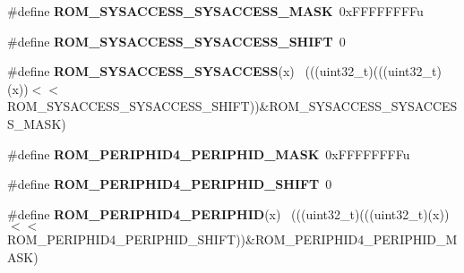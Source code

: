 \begin{DoxyCompactItemize}
\item 
\hypertarget{group___r_o_m___register___masks_gab3acbf5e9fc0f3ad82ae4e0004d0216d}{}\#define {\bfseries R\+O\+M\+\_\+\+S\+Y\+S\+A\+C\+C\+E\+S\+S\+\_\+\+S\+Y\+S\+A\+C\+C\+E\+S\+S\+\_\+\+M\+A\+S\+K}~0x\+F\+F\+F\+F\+F\+F\+F\+Fu\label{group___r_o_m___register___masks_gab3acbf5e9fc0f3ad82ae4e0004d0216d}

\item 
\hypertarget{group___r_o_m___register___masks_ga3490b2f91c6a67625992dbc90f0e5a27}{}\#define {\bfseries R\+O\+M\+\_\+\+S\+Y\+S\+A\+C\+C\+E\+S\+S\+\_\+\+S\+Y\+S\+A\+C\+C\+E\+S\+S\+\_\+\+S\+H\+I\+F\+T}~0\label{group___r_o_m___register___masks_ga3490b2f91c6a67625992dbc90f0e5a27}

\item 
\hypertarget{group___r_o_m___register___masks_ga81c24d70e0f959fbd6e8d3cb9aa311cc}{}\#define {\bfseries R\+O\+M\+\_\+\+S\+Y\+S\+A\+C\+C\+E\+S\+S\+\_\+\+S\+Y\+S\+A\+C\+C\+E\+S\+S}(x)                          ~(((uint32\+\_\+t)(((uint32\+\_\+t)(x))$<$$<$R\+O\+M\+\_\+\+S\+Y\+S\+A\+C\+C\+E\+S\+S\+\_\+\+S\+Y\+S\+A\+C\+C\+E\+S\+S\+\_\+\+S\+H\+I\+F\+T))\&R\+O\+M\+\_\+\+S\+Y\+S\+A\+C\+C\+E\+S\+S\+\_\+\+S\+Y\+S\+A\+C\+C\+E\+S\+S\+\_\+\+M\+A\+S\+K)\label{group___r_o_m___register___masks_ga81c24d70e0f959fbd6e8d3cb9aa311cc}

\item 
\hypertarget{group___r_o_m___register___masks_gad17e07925ea552218422be227581a58f}{}\#define {\bfseries R\+O\+M\+\_\+\+P\+E\+R\+I\+P\+H\+I\+D4\+\_\+\+P\+E\+R\+I\+P\+H\+I\+D\+\_\+\+M\+A\+S\+K}~0x\+F\+F\+F\+F\+F\+F\+F\+Fu\label{group___r_o_m___register___masks_gad17e07925ea552218422be227581a58f}

\item 
\hypertarget{group___r_o_m___register___masks_ga4ea3b3a45be6eb8eb4372f565af2d5d9}{}\#define {\bfseries R\+O\+M\+\_\+\+P\+E\+R\+I\+P\+H\+I\+D4\+\_\+\+P\+E\+R\+I\+P\+H\+I\+D\+\_\+\+S\+H\+I\+F\+T}~0\label{group___r_o_m___register___masks_ga4ea3b3a45be6eb8eb4372f565af2d5d9}

\item 
\hypertarget{group___r_o_m___register___masks_gafa1aef93a78a023fc20519a2128d8a2c}{}\#define {\bfseries R\+O\+M\+\_\+\+P\+E\+R\+I\+P\+H\+I\+D4\+\_\+\+P\+E\+R\+I\+P\+H\+I\+D}(x)                            ~(((uint32\+\_\+t)(((uint32\+\_\+t)(x))$<$$<$R\+O\+M\+\_\+\+P\+E\+R\+I\+P\+H\+I\+D4\+\_\+\+P\+E\+R\+I\+P\+H\+I\+D\+\_\+\+S\+H\+I\+F\+T))\&R\+O\+M\+\_\+\+P\+E\+R\+I\+P\+H\+I\+D4\+\_\+\+P\+E\+R\+I\+P\+H\+I\+D\+\_\+\+M\+A\+S\+K)\label{group___r_o_m___register___masks_gafa1aef93a78a023fc20519a2128d8a2c}


\end{DoxyCompactItemize}
